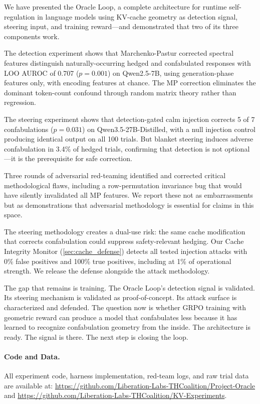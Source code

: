 We have presented the Oracle Loop, a complete architecture for runtime
self-regulation in language models using KV-cache geometry as detection
signal, steering input, and training reward---and demonstrated that two
of its three components work.

The detection experiment shows that Marchenko-Pastur corrected spectral
features distinguish naturally-occurring hedged and confabulated responses
with LOO AUROC of 0.707 ($p = 0.001$) on Qwen2.5-7B, using
generation-phase features only, with encoding features at chance. The MP
correction eliminates the dominant token-count confound through random
matrix theory rather than regression.

The steering experiment shows that detection-gated calm injection corrects
5 of 7 confabulations ($p = 0.031$) on Qwen3.5-27B-Distilled, with
a null injection control producing identical output on all 100 trials. But
blanket steering induces adverse confabulation in 3.4\% of hedged trials,
confirming that detection is not optional---it is the prerequisite for safe
correction.

Three rounds of adversarial red-teaming identified and corrected critical
methodological flaws, including a row-permutation invariance bug that would
have silently invalidated all MP features. We report these not as
embarrassments but as demonstrations that adversarial methodology is
essential for claims in this space.

The steering methodology creates a dual-use risk: the same cache
modification that corrects confabulation could suppress safety-relevant
hedging. Our Cache Integrity Monitor (\cref{sec:cache_defense}) detects
all tested injection attacks with 0\% false positives and 100\% true
positives, including at 1\% of operational strength. We release the
defense alongside the attack methodology.

The gap that remains is training. The Oracle Loop's detection signal is
validated. Its steering mechanism is validated as proof-of-concept. Its
attack surface is characterized and defended. The question now is whether
GRPO training with geometric reward can produce a model that confabulates
less because it has learned to recognize confabulation geometry from the
inside. The architecture is ready. The signal is there. The next step is
closing the loop.

\paragraph{Code and Data.}
All experiment code, harness implementation, red-team logs, and raw trial
data are available at:
\url{https://github.com/Liberation-Labs-THCoalition/Project-Oracle}
and
\url{https://github.com/Liberation-Labs-THCoalition/KV-Experiments}.
